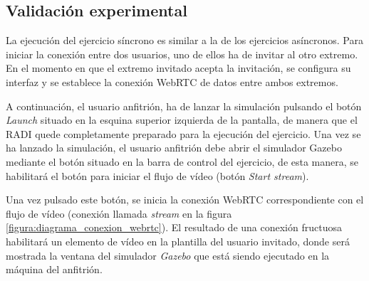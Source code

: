 \documentclass[a4paper, 12pt]{book}
\begin{document}
\subsection{Validación experimental}

La ejecución del ejercicio síncrono es similar a la de los ejercicios asíncronos. Para iniciar la conexión entre dos usuarios, uno de ellos ha de invitar al otro extremo. En el momento en que el extremo invitado acepta la invitación, se configura su interfaz y se establece la conexión WebRTC de datos entre ambos extremos. 



A continuación, el usuario anfitrión, ha de lanzar la simulación pulsando el botón \emph{Launch} situado en la esquina superior izquierda de la pantalla, de manera que el RADI quede completamente preparado para la ejecución del ejercicio. Una vez se ha lanzado la simulación, el usuario anfitrión debe abrir el simulador Gazebo mediante el botón situado en la barra de control del ejercicio, de esta manera, se habilitará el botón para iniciar el flujo de vídeo (botón \emph{Start stream}). 


Una vez pulsado este botón, se inicia la conexión WebRTC correspondiente con el flujo de vídeo (conexión llamada \emph{stream} en la figura \ref{figura:diagrama_conexion_webrtc}). El resultado de una conexión fructuosa habilitará un elemento de vídeo en la plantilla del usuario invitado, donde será mostrada la ventana del simulador \emph{Gazebo} que está siendo ejecutado en la máquina del anfitrión.
\end{document}
